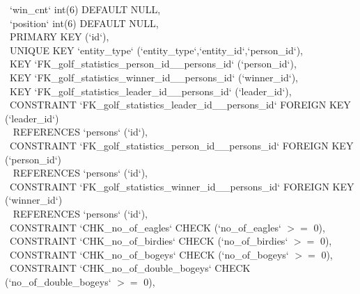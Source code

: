 \documentclass[titlepage]{article}
\begin{document}
\begin{itemize}
\-\ \hspace{30pt}`win\_cnt` int(6) DEFAULT NULL, \\
\-\ \hspace{30pt}`position` int(6) DEFAULT NULL, \\
\-\ \hspace{30pt}PRIMARY KEY (`id`), \\
\-\ \hspace{30pt}UNIQUE KEY `entity\_type` (`entity\_type`,`entity\_id`,`person\_id`), \\
\-\ \hspace{30pt}KEY `FK\_golf\_statistics\_person\_id\_\_persons\_id` (`person\_id`), \\
\-\ \hspace{30pt}KEY `FK\_golf\_statistics\_winner\_id\_\_persons\_id` (`winner\_id`), \\
\-\ \hspace{30pt}KEY `FK\_golf\_statistics\_leader\_id\_\_persons\_id` (`leader\_id`), \\
\-\ \hspace{30pt}CONSTRAINT `FK\_golf\_statistics\_leader\_id\_\_persons\_id` FOREIGN KEY (`leader\_id`) \\ \-\ \hspace{30pt} REFERENCES `persons` (`id`), \\
\-\ \hspace{30pt}CONSTRAINT `FK\_golf\_statistics\_person\_id\_\_persons\_id` FOREIGN KEY (`person\_id`) \\ \-\ \hspace{30pt} REFERENCES `persons` (`id`), \\
\-\ \hspace{30pt}CONSTRAINT `FK\_golf\_statistics\_winner\_id\_\_persons\_id` FOREIGN KEY (`winner\_id`) \\ \-\ \hspace{30pt} REFERENCES `persons` (`id`), \\
\-\ \hspace{30pt}CONSTRAINT `CHK\_no\_of\_eagles` CHECK (`no\_of\_eagles` $>=$ 0), \\
\-\ \hspace{30pt}CONSTRAINT `CHK\_no\_of\_birdies` CHECK (`no\_of\_birdies` $>=$ 0), \\
\-\ \hspace{30pt}CONSTRAINT `CHK\_no\_of\_bogeys` CHECK (`no\_of\_bogeys` $>=$ 0), \\
\-\ \hspace{30pt}CONSTRAINT `CHK\_no\_of\_double\_bogeys` CHECK (`no\_of\_double\_bogeys` $>=$ 0), \\

\end{itemize}
\end{document}
